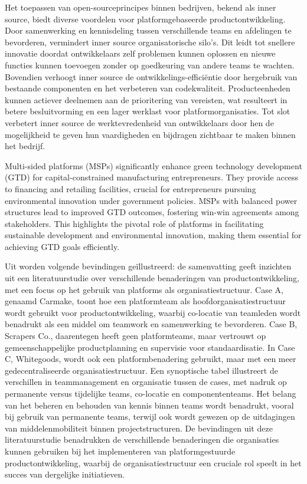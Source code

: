 \textcite{Riehle_2016} Het toepassen van open-sourceprincipes binnen bedrijven, bekend als inner source, biedt diverse voordelen voor platformgebaseerde productontwikkeling. Door samenwerking en kennisdeling tussen verschillende teams en afdelingen te bevorderen, vermindert inner source organisatorische silo’s. Dit leidt tot snellere innovatie doordat ontwikkelaars zelf problemen kunnen oplossen en nieuwe functies kunnen toevoegen zonder op goedkeuring van andere teams te wachten. Bovendien verhoogt inner source de ontwikkelings-efficiëntie door hergebruik van bestaande componenten en het verbeteren van codekwaliteit. Producteenheden kunnen actiever deelnemen aan de prioritering van vereisten, wat resulteert in betere besluitvorming en een lager werklast voor platformorganisaties. Tot slot verbetert inner source de werktevredenheid van ontwikkelaars door hen de mogelijkheid te geven hun vaardigheden en bijdragen zichtbaar te maken binnen het bedrijf.

\textcite{Reza_Gharehbagh_2022} Multi-sided platforms (MSPs) significantly enhance green technology development (GTD) for capital-constrained manufacturing entrepreneurs. They provide access to financing and retailing facilities, crucial for entrepreneurs pursuing environmental innovation under government policies. MSPs with balanced power structures lead to improved GTD outcomes, fostering win-win agreements among stakeholders. This highlights the pivotal role of platforms in facilitating sustainable development and environmental innovation, making them essential for achieving GTD goals efficiently.

Uit \textcite{Muffatto_2000}  worden volgende bevindingen geïllustreerd: de samenvatting geeft inzichten uit een literatuurstudie over verschillende benaderingen van productontwikkeling, met een focus op het gebruik van platforms als organisatiestructuur. Case A, genaamd Carmake, toont hoe een platformteam als hoofdorganisatiestructuur wordt gebruikt voor productontwikkeling, waarbij co-locatie van teamleden wordt benadrukt als een middel om teamwork en samenwerking te bevorderen. Case B, Scrapers Co., daarentegen heeft geen platformteams, maar vertrouwt op gemeenschappelijke productplanning en supervisie voor standaardisatie. In Case C, Whitegoods, wordt ook een platformbenadering gebruikt, maar met een meer gedecentraliseerde organisatiestructuur. Een synoptische tabel illustreert de verschillen in teammanagement en organisatie tussen de cases, met nadruk op permanente versus tijdelijke teams, co-locatie en componententeams. Het belang van het beheren en behouden van kennis binnen teams wordt benadrukt, vooral bij gebruik van permanente teams, terwijl ook wordt gewezen op de uitdagingen van middelenmobiliteit binnen projectstructuren. De bevindingen uit deze literatuurstudie benadrukken de verschillende benaderingen die organisaties kunnen gebruiken bij het implementeren van platformgestuurde productontwikkeling, waarbij de organisatiestructuur een cruciale rol speelt in het succes van dergelijke initiatieven.


